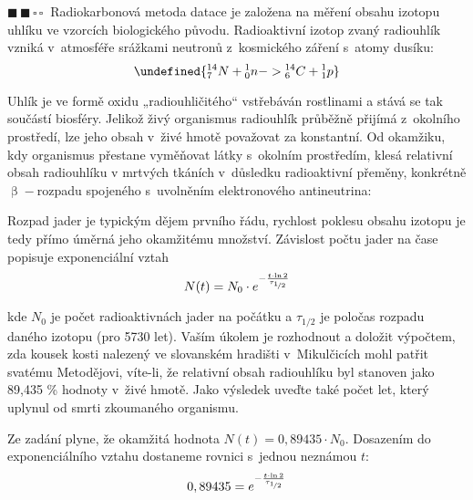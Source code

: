 \documentclass{book}
\let\ch\undefined
\newcommand{\dva}{$\blacksquare \, \blacksquare \, \square \, \square \; \; $}
\renewenvironment{quotation}{\par}{\par} %
\begin{document}
\hrulefill %
\begin{quotation}
\dva Radiokarbonová metoda datace je založena na měření obsahu izotopu uhlíku ve vzorcích biologického původu. Radioaktivní izotop zvaný radiouhlík vzniká v~atmosféře srážkami neutronů z~kosmického záření s~atomy dusíku: 
\shorthandoff{-}
\begin{equation*}
\ch{{^{14}_{7}N} + {^{1}_{0}n} -> {^{14}_{6}C} + {^{1}_{1}p}}
\end{equation*}
\shorthandon{-} 

\noindent Uhlík \ch{^{14}_{6}C} je ve formě oxidu „radiouhličitého“ vstřebáván
rostlinami a stává se tak součástí biosféry. Jelikož živý organismus
radiouhlík průběžně přijímá z~okolního prostředí, lze jeho obsah v~živé hmotě považovat za konstantní. Od okamžiku, kdy organismus přestane
vyměňovat látky s~okolním prostředím, klesá relativní obsah radiouhlíku
v mrtvých tkáních v~důsledku radioaktivní přeměny, konkrétně $\upbeta-$rozpadu
spojeného s~uvolněním elektronového antineutrina:
\shorthandoff{-}
\begin{center}
\ch{{^{14}_{6}C} -> {^{14}_{7}N} + {^{0}_{-1}e^{-}} +  $\bar{\nu}_{\mathrm{e}}$}
\end{center}
\shorthandon{-}
Rozpad jader je typickým dějem prvního řádu, rychlost poklesu obsahu izotopu je tedy přímo úměrná jeho okamžitému množství. Závislost počtu jader na čase popisuje exponenciální vztah
\[
N(t)=N_{0}\cdot e^{-\frac{t\cdot\ln2}{\tau_{\nicefrac{1}{2}}}}
\]

kde $N_{0}$ je počet radioaktivnách jader na počátku a $\tau_{1/2}$
je poločas rozpadu daného izotopu (pro \ch{^{14}_{6}C} 5730
let). Vaším úkolem je rozhodnout a doložit výpočtem, zda kousek kosti
nalezený ve slovanském hradišti v~Mikulčicích mohl patřit svatému
Metodějovi, víte-li, že relativní obsah radiouhlíku byl stanoven jako
89,435 \% hodnoty v~živé hmotě. Jako výsledek uveďte také počet let,
který uplynul od smrti zkoumaného organismu.
\end{quotation} \dotfill \par 

\newpage %
Ze zadání plyne, že okamžitá hodnota $N(t)=0,89435\cdot N_{0}$. Dosazením
do exponenciálního vztahu dostaneme rovnici s~jednou neznámou $t$:
\[
0,89435=e^{-\frac{t\cdot\ln2}{\tau_{\nicefrac{1}{2}}}}
\]
\end{document}
